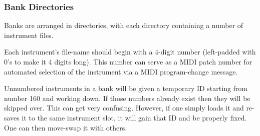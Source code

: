 \subsubsection{Bank Directories}
\label{subsubsec:banks_and_roots_bank_directories}

   Banks are arranged in directories, with each directory containing a number
   of instrument files.

   Each instrument's file-name should begin with a 4-digit number
   (left-padded with 0's to make it 4 digits long).  This number can serve
   as a MIDI patch number for automated selection of the instrument via a
   MIDI program-change message.

   Unnumbered instruments in a bank will be given a temporary ID starting
   from number 160 and working down. If those numbers already exist then
   they will be skipped over. This can get very confusing. However, if one
   simply loads it and re-saves it to the same instrument slot, it will gain
   that ID and be properly fixed.  One can then move-swap it with others.


